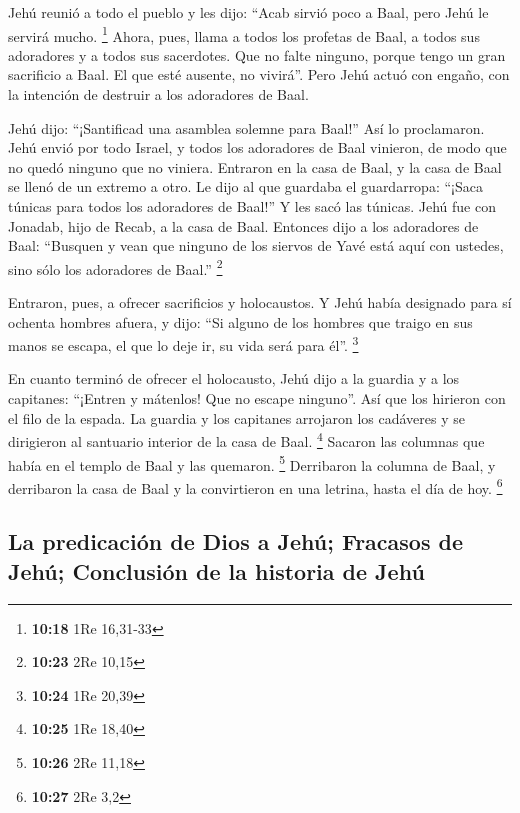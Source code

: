  Jehú reunió a todo el pueblo y les dijo: ``Acab sirvió
poco a Baal, pero Jehú le servirá mucho. \footnote{\textbf{10:18} 1Re
  16,31-33}  Ahora, pues, llama a todos los profetas de
Baal, a todos sus adoradores y a todos sus sacerdotes. Que no falte
ninguno, porque tengo un gran sacrificio a Baal. El que esté ausente, no
vivirá''. Pero Jehú actuó con engaño, con la intención de destruir a los
adoradores de Baal.

 Jehú dijo: ``¡Santificad una asamblea solemne para
Baal!'' Así lo proclamaron.  Jehú envió por todo Israel,
y todos los adoradores de Baal vinieron, de modo que no quedó ninguno
que no viniera. Entraron en la casa de Baal, y la casa de Baal se llenó
de un extremo a otro.  Le dijo al que guardaba el
guardarropa: ``¡Saca túnicas para todos los adoradores de Baal!'' Y les
sacó las túnicas.  Jehú fue con Jonadab, hijo de Recab, a
la casa de Baal. Entonces dijo a los adoradores de Baal: ``Busquen y
vean que ninguno de los siervos de Yavé está aquí con ustedes, sino sólo
los adoradores de Baal.'' \footnote{\textbf{10:23} 2Re 10,15}

 Entraron, pues, a ofrecer sacrificios y holocaustos. Y
Jehú había designado para sí ochenta hombres afuera, y dijo: ``Si alguno
de los hombres que traigo en sus manos se escapa, el que lo deje ir, su
vida será para él''. \footnote{\textbf{10:24} 1Re 20,39}

 En cuanto terminó de ofrecer el holocausto, Jehú dijo a
la guardia y a los capitanes: ``¡Entren y mátenlos! Que no escape
ninguno''. Así que los hirieron con el filo de la espada. La guardia y
los capitanes arrojaron los cadáveres y se dirigieron al santuario
interior de la casa de Baal. \footnote{\textbf{10:25} 1Re 18,40}
 Sacaron las columnas que había en el templo de Baal y
las quemaron. \footnote{\textbf{10:26} 2Re 11,18} 
Derribaron la columna de Baal, y derribaron la casa de Baal y la
convirtieron en una letrina, hasta el día de hoy. \footnote{\textbf{10:27}
  2Re 3,2}

\hypertarget{la-predicaciuxf3n-de-dios-a-jehuxfa-fracasos-de-jehuxfa-conclusiuxf3n-de-la-historia-de-jehuxfa}{%
\subsection{La predicación de Dios a Jehú; Fracasos de Jehú; Conclusión
de la historia de
Jehú}\label{la-predicaciuxf3n-de-dios-a-jehuxfa-fracasos-de-jehuxfa-conclusiuxf3n-de-la-historia-de-jehuxfa}}

